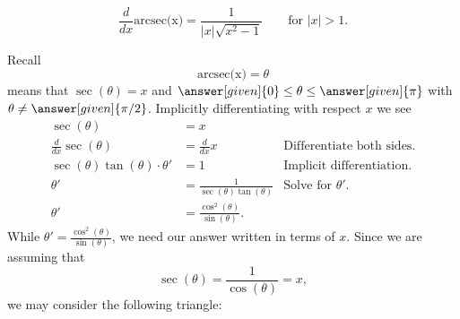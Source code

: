 \documentclass{ximera}
\begin{document}
\begin{theorem}
\[
\frac{d}{dx} \text{arcsec(x)} = \frac{1}{|x|\sqrt{x^2-1}}\qquad\text{for $|x|>1$.}
\]
\begin{explanation} 
  Recall
\[
\text{arcsec(x)} = \theta
\]
means that $\sec(\theta) = x$ and $\answer[given]{0}\le \theta\le
\answer[given]{\pi}$ with $\theta\ne \answer[given]{\pi/2}$.  Implicitly
differentiating with respect $x$ we see
\begin{align*}
\sec(\theta) &= x\\
\frac{d}{dx} \sec(\theta) &= \frac{d}{dx} x                     &\text{Differentiate both sides.}\\
\sec(\theta)\tan(\theta) \cdot \theta' &= 1     &\text{Implicit differentiation.}\\
\theta' &= \frac{1}{\sec(\theta)\tan(\theta)}   &\text{Solve for $\theta'$.}\\
\theta' &= \frac{\cos^2(\theta)}{\sin(\theta)}.
\end{align*}
While $\theta' = \frac{\cos^2(\theta)}{\sin(\theta)}$, we need our
answer written in terms of $x$. Since we are assuming that
\[
\sec(\theta) = \frac{1}{\cos(\theta)}= x,
\]
we may consider the following triangle:
    \begin{image}[2in]
\end{image}
\end{explanation}
\end{theorem}
\end{document}
